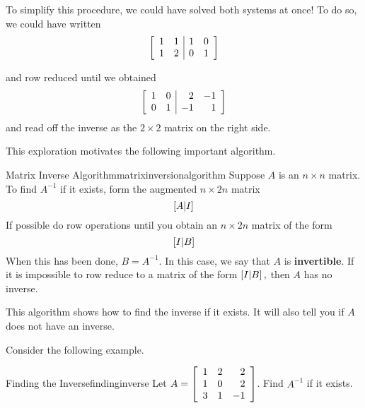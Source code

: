 To simplify this procedure, we could have solved both systems at once!
To do so, we could have written
\begin{equation*}
\left[
\begin{array}{rr|rr}
1 & 1 & 1 & 0 \\
1 & 2 & 0 & 1
\end{array}
\right]
\end{equation*}

and row reduced until we obtained
\begin{equation*}
\left[
\begin{array}{rr|rr}
1 & 0 & 2 & -1 \\
0 & 1 & -1 & 1
\end{array}
\right]
\end{equation*}
and read off the inverse as the $2\times 2$ matrix on the right side.

This exploration motivates the following important algorithm.

\begin{algorithm}{Matrix Inverse Algorithm}{matrixinversionalgorithm}
Suppose $A$ is an $n\times n$ matrix.  To find $A^{-1}$ if it exists, form
the augmented $n\times 2n$ matrix
\begin{equation*}
\left[ A|I\right]
\end{equation*}
If possible do row operations until you obtain an $n\times 2n$
matrix of the form
\begin{equation*}
\left[ I|B\right]  
\end{equation*}
When this has been done, $B=A^{-1}.$ In this case, we say that $A$ is \textbf{invertible}. 
If it is impossible to row reduce to a
matrix of the form $\left[ I|B\right] ,$ then $A$ has no inverse.
\end{algorithm}

This algorithm shows how to find the inverse if it exists. It will also tell you if
$A$ does not have an inverse. 

Consider the following example.

\begin{example}{Finding the Inverse}{findinginverse}
Let $A=\left[
\begin{array}{rrr}
1 & 2 & 2 \\
1 & 0 & 2 \\
3 & 1 & -1
\end{array}
\right] $. Find $A^{-1}$ if it exists.
\end{example}

